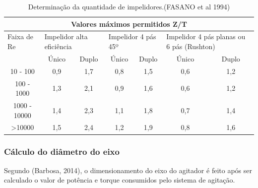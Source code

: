 \begin{table}[]
\centering
\resizebox{\textwidth}{!} {
\begin{tabular}{|c|c|c|c|c|c|c|}
\hline
\multicolumn{7}{|c|}{Valores máximos permitidos Z/T}                                                                                                                                           \\ \hline
\multicolumn{1}{|l|}{Faixa de Re} & \multicolumn{2}{l|}{Impelidor alta eficiência} & \multicolumn{2}{l|}{Impelidor 4 pás 45º} & \multicolumn{2}{l|}{Impelidor 4 pás planas ou 6 pás (Rushton)} \\ \hline
\multicolumn{1}{|l|}{}            & Único                  & Duplo                 & Único               & Duplo              & Único                          & Duplo                         \\ \hline
10 - 100                          & 0,9                    & 1,7                   & 0,8                 & 1,5                & 0,6                            & 1,2                           \\ \hline
100 - 1000                        & 1,3                    & 2,1                   & 0,9                 & 1,6                & 0,6                            & 1,2                           \\ \hline
1000 - 10000                      & 1,4                    & 2,3                   & 1,1                 & 1,8                & 0,7                            & 1,4                           \\ \hline
\textgreater 10000                & 1,5                    & 2,4                   & 1,2                 & 1,9                & 0,8                            & 1,6                           \\ \hline
\end{tabular}
}
\caption{Determinação da quantidade de impelidores.(FASANO et al 1994)}
\label{impelidores}
\end{table}

\subsubsection{Cálculo do diâmetro do eixo}

Segundo (Barbosa, 2014), o dimensionamento do eixo do agitador é feito após ser calculado o valor de potência e torque consumidos pelo sistema de agitação.


